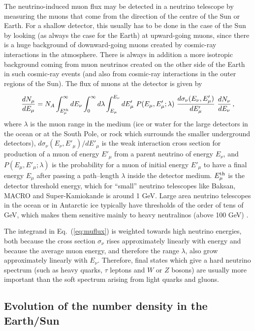 \documentclass[a4paper,10pt,oneside]{book}
\newcommand{\beq}{\begin{equation}}
\newcommand{\eeq}{\end{equation}}
\begin{document}
The neutrino-induced muon flux may be detected in a neutrino telescope
by measuring the muons that come from the direction of the centre
of the Sun or Earth. For a shallow detector, this usually has to
be done in the case of the Sun by looking (as always the case for
the Earth) at upward-going muons, since there is a huge background
of downward-going muons created by cosmic-ray interactions in the
atmosphere. There is always in addition a more isotropic
background coming from muon neutrinos created on the other side of
the Earth in such cosmic-ray events (and also from cosmic-ray
interactions in the outer regions of the Sun).
The flux of muons at the detector is  given by

\beq
\frac{d N_\mu}{d E_\mu}
= N_A \int^\infty_{E_\mu^{\rm th}} d E_\nu
\int_0^\infty d\lambda \int_{E_\mu}^{E_\nu}
d {E'_\mu }\,\,
P(E_\mu,E'_\mu; \lambda)\,\,
\frac{d \sigma_\nu (E_\nu,E'_\mu)}{d E'_\mu} \,\,
\frac{d N_\nu}{d E_\nu}\, ,
\label{eq:muflux}
\eeq
where $\lambda$ is the muon range in the medium (ice or water
for the large detectors in the ocean or at the South Pole,
or rock which surrounds the smaller underground detectors),
$d \sigma_\nu (E_\nu,E'_\mu) / d E'_\mu$ is
the weak interaction cross section for production of a muon of
energy $E'_\mu$ from a parent neutrino of energy $E_\nu$, and
$P(E_\mu,E'_\mu; \lambda)$ is the
probability for a muon of initial energy $E'_\mu$
to have a final energy $E_\mu$ after passing
  a path--length $\lambda$ inside the detector medium.
$E_\mu^{\rm th}$ is the detector threshold energy, which for
``small''
neutrino telescopes like Baksan, MACRO and Super-Kamiokande is
around 1 GeV.
Large area neutrino telescopes in the ocean  or in Antarctic ice
typically
have thresholds of the order of tens of GeV, which makes them
sensitive mainly to heavy neutralinos (above 100 GeV)
\cite{Bergstrom:1998xh}.

The integrand in Eq.~(\ref{eq:muflux}) is weighted towards high
neutrino energies, both because the cross section $\sigma_\nu$
rises approximately linearly with energy and because the average
muon energy, and therefore the range $\lambda$, also grow
approximately linearly with $E_\nu$. Therefore, final states
which give a hard neutrino spectrum (such as heavy quarks, $\tau$
leptons and $W$ or $Z$ bosons) are usually more important
than the soft spectrum arising from light quarks and gluons.

\subsection{Evolution of the number density in the Earth/Sun}
\end{document}
